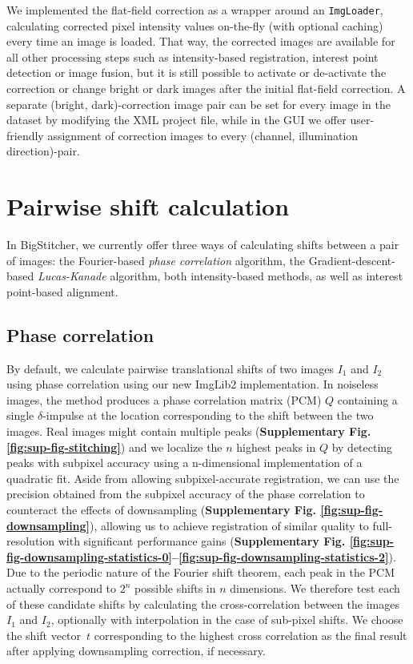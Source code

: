 We implemented the flat-field correction as a wrapper around an \texttt{ImgLoader}, calculating corrected pixel intensity values on-the-fly (with optional caching) every time an image is loaded. That way, the corrected images are available for all other processing steps such as intensity-based registration, interest point detection or image fusion, but it is still possible to activate or de-activate the correction or change bright or dark images after the initial flat-field correction. A separate (bright, dark)-correction image pair can be set for every image in the dataset by modifying the XML project file, while in the GUI we offer user-friendly assignment of correction images to every (channel, illumination direction)-pair.

\section{Pairwise shift calculation}
\label{sec:pairwiseshift}

In BigStitcher, we currently offer three ways of calculating shifts between a pair of images: the Fourier-based \emph{phase correlation} algorithm, the Gradient-descent-based \emph{Lucas-Kanade} algorithm, both intensity-based methods, as well as interest point-based alignment.

\subsection*{Phase correlation}

By default, we calculate pairwise translational shifts of two images $I_1$ and $I_2$ using phase correlation \cite{preibisch2009globally, kuglin1975phase} using our new ImgLib2 implementation\cite{imglib2}. In noiseless images, the method produces a phase correlation matrix (PCM) $Q$ containing a single $\delta$-impulse at the location corresponding to the shift between the two images. Real images might contain multiple peaks (\textbf{Supplementary Fig. \ref{fig:sup-fig-stitching}}) and we localize the $n$ highest peaks in $Q$ by detecting peaks with subpixel accuracy using a n-dimensional implementation of a quadratic fit\cite{lowe2004distinctive}. Aside from allowing subpixel-accurate registration, we can use the precision obtained from the subpixel accuracy of the phase correlation to counteract the effects of downsampling (\textbf{Supplementary Fig. \ref{fig:sup-fig-downsampling}}), allowing us to achieve registration of similar quality to full-resolution with significant performance gains (\textbf{Supplementary Fig. \ref{fig:sup-fig-downsampling-statistics-0}--\ref{fig:sup-fig-downsampling-statistics-2}}). Due to the periodic nature of the Fourier shift theorem, each peak in the PCM actually correspond to $2^n$ possible shifts in $n$ dimensions. We therefore test each of these candidate shifts by calculating the cross-correlation between the images $I_1$ and $I_2$, optionally with interpolation in the case of sub-pixel shifts\cite{lowe2004distinctive}. We choose the shift vector~$t$ corresponding to the highest cross correlation as the final result after applying downsampling correction, if necessary.

